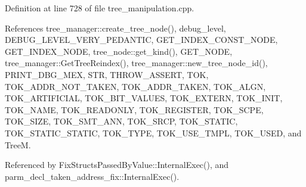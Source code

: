 Definition at line 728 of file tree\+\_\+manipulation.\+cpp.



References tree\+\_\+manager\+::create\+\_\+tree\+\_\+node(), debug\+\_\+level, D\+E\+B\+U\+G\+\_\+\+L\+E\+V\+E\+L\+\_\+\+V\+E\+R\+Y\+\_\+\+P\+E\+D\+A\+N\+T\+IC, G\+E\+T\+\_\+\+I\+N\+D\+E\+X\+\_\+\+C\+O\+N\+S\+T\+\_\+\+N\+O\+DE, G\+E\+T\+\_\+\+I\+N\+D\+E\+X\+\_\+\+N\+O\+DE, tree\+\_\+node\+::get\+\_\+kind(), G\+E\+T\+\_\+\+N\+O\+DE, tree\+\_\+manager\+::\+Get\+Tree\+Reindex(), tree\+\_\+manager\+::new\+\_\+tree\+\_\+node\+\_\+id(), P\+R\+I\+N\+T\+\_\+\+D\+B\+G\+\_\+\+M\+EX, S\+TR, T\+H\+R\+O\+W\+\_\+\+A\+S\+S\+E\+RT, T\+OK, T\+O\+K\+\_\+\+A\+D\+D\+R\+\_\+\+N\+O\+T\+\_\+\+T\+A\+K\+EN, T\+O\+K\+\_\+\+A\+D\+D\+R\+\_\+\+T\+A\+K\+EN, T\+O\+K\+\_\+\+A\+L\+GN, T\+O\+K\+\_\+\+A\+R\+T\+I\+F\+I\+C\+I\+AL, T\+O\+K\+\_\+\+B\+I\+T\+\_\+\+V\+A\+L\+U\+ES, T\+O\+K\+\_\+\+E\+X\+T\+E\+RN, T\+O\+K\+\_\+\+I\+N\+IT, T\+O\+K\+\_\+\+N\+A\+ME, T\+O\+K\+\_\+\+R\+E\+A\+D\+O\+N\+LY, T\+O\+K\+\_\+\+R\+E\+G\+I\+S\+T\+ER, T\+O\+K\+\_\+\+S\+C\+PE, T\+O\+K\+\_\+\+S\+I\+ZE, T\+O\+K\+\_\+\+S\+M\+T\+\_\+\+A\+NN, T\+O\+K\+\_\+\+S\+R\+CP, T\+O\+K\+\_\+\+S\+T\+A\+T\+IC, T\+O\+K\+\_\+\+S\+T\+A\+T\+I\+C\+\_\+\+S\+T\+A\+T\+IC, T\+O\+K\+\_\+\+T\+Y\+PE, T\+O\+K\+\_\+\+U\+S\+E\+\_\+\+T\+M\+PL, T\+O\+K\+\_\+\+U\+S\+ED, and TreeM.



Referenced by Fix\+Structs\+Passed\+By\+Value\+::\+Internal\+Exec(), and parm\+\_\+decl\+\_\+taken\+\_\+address\+\_\+fix\+::\+Internal\+Exec().

